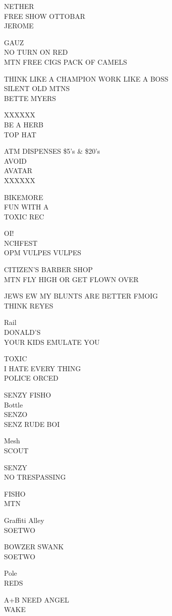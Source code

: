 \documentclass[10pt,letterpaper]{article}
\begin{document}
NETHER\\
FREE SHOW OTTOBAR\\
JEROME

GAUZ\\
NO TURN ON RED\\
MTN FREE CIGS PACK OF CAMELS

THINK LIKE A CHAMPION WORK LIKE A BOSS\\
SILENT OLD MTNS\\
BETTE MYERS

XXXXXX\\
BE A HERB\\
TOP HAT

ATM DISPENSES \$5's \& \$20's\\
AVOID\\
AVATAR\\
XXXXXX

BIKEMORE\\
FUN WITH A\\
TOXIC REC

OI!\\
NCHFEST\\
OPM VULPES VULPES

CITIZEN'S BARBER SHOP\\
MTN FLY HIGH OR GET FLOWN OVER

JEWS EW MY BLUNTS ARE BETTER FMOIG\\
THINK REYES

Rail\\
DONALD'S\\
YOUR KIDS EMULATE YOU

TOXIC\\
I HATE EVERY THING\\
POLICE ORCED

SENZY FISHO\\
Bottle\\
SENZO\\
SENZ RUDE BOI

Mesh\\
SCOUT

SENZY\\
NO TRESPASSING

FISHO\\
MTN

Graffiti Alley\\
SOETWO

BOWZER SWANK\\
SOETWO

Pole\\
REDS

A+B NEED ANGEL\\
WAKE
\end{document}
